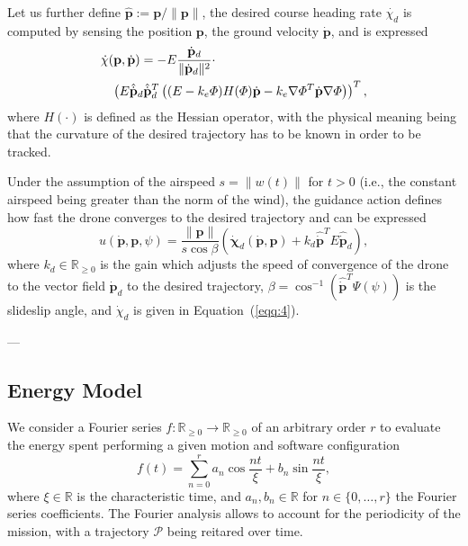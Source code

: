 \documentclass[letterpaper,10pt,conference]{ieeeconf}
\begin{document}
Let us further define $\hat{\mathbf{p}}:=\mathbf{p}/\|\mathbf{p}\|$, the desired course heading rate $\dot{\chi_d}$ is computed by sensing the position $\mathbf{p}$, the ground velocity $\dot{\mathbf{p}}$, and is expressed
\begin{equation}\label{eqq:4}\begin{split}
  &\dot{\chi}(\mathbf{p},\dot{\mathbf{p}})=-E\frac{\dot{\mathbf{p}}_d}{\|\dot{\mathbf{p}}_d\|^2}\cdot\\
  &\hspace{2ex}\left( E\hat{\dot{\mathbf{p}}}_d\hat{\dot{\mathbf{p}}}_d^T\left( (E-k_e\varPhi)H(\varPhi)\dot{\mathbf{p}}-k_e\nabla\varPhi^T\dot{\mathbf{p}}\nabla\varPhi \right) \right)^T,
\end{split}
\end{equation} 
where $H(\cdot)$ is defined as the Hessian operator, with the physical meaning being that the curvature of the desired trajectory has to be known in order to be tracked.

Under the assumption of the airspeed $s=\|w(t)\|$ for $t>0$ (i.e., the constant airspeed being greater than the norm of the wind), the guidance action defines how fast the drone converges to the desired trajectory and can be expressed
\begin{equation}\label{eqq:5}
  u(\dot{\mathbf{p}},\mathbf{p},\psi)=\frac{\|\mathbf{p}\|}{s\cos{\beta}}\left( \dot{\mathbf{\chi}}_d(\dot{\mathbf{p}},\mathbf{p})+k_d\hat{\dot{\mathbf{p}}}^TE\hat{\dot{\mathbf{p}}}_d \right),
\end{equation} 
where $k_d\in\mathbb{R}_{\geq 0}$ is the gain which adjusts the speed of convergence of the drone to the vector field $\dot{\mathbf{p}}_d$ to the desired trajectory, $\beta=\cos^{-1}{\left( \hat{\dot{\mathbf{p}}}^T\Psi(\psi) \right)}$ is the slideslip angle, and $\dot{\chi}_d$ is given in Equation~(\ref{eqq:4}).

---

\subsection{Energy Model}

We consider a Fourier series $f:\mathbb{R}_{\geq 0}\rightarrow\mathbb{R}_{\geq 0}$ of an arbitrary order $r$ to evaluate the energy spent performing a given motion and software configuration
\begin{equation}\label{eqq:6}
  f(t)=\sum_{n=0}^{r}{a_n\cos{\frac{nt}{\xi}}+b_n\sin{\frac{nt}{\xi}}},
\end{equation}
where $\xi\in\mathbb{R}$ is the characteristic time, and $a_n, b_n\in\mathbb{R}$ for $n\in\{0,\dotsc,r\}$ the Fourier series coefficients. The Fourier analysis allows to account for the periodicity of the mission, with a trajectory $\mathcal{P}$ being reitared over time. 
\end{document}
